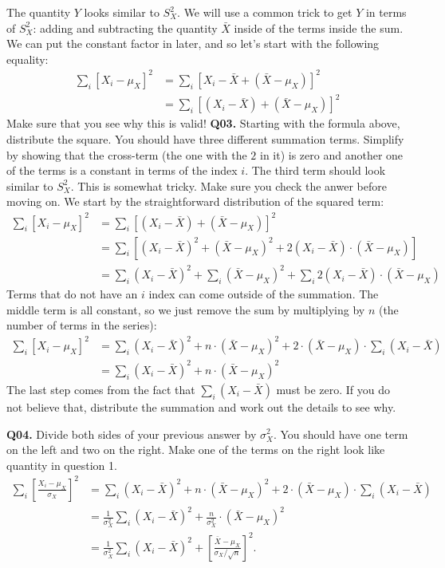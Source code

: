 \documentclass[12pt]{article}
\newcommand{\cblack}{\color{Black}}
\newcommand{\cblue}{\color{MidnightBlue}}
\begin{document}
The quantity $Y$ looks similar to $S_X^2$. We will use a common trick to
get $Y$ in terms of $S_X^2$: adding and subtracting the quantity $\bar{X}$
inside of the terms inside the sum. We can put the constant factor in later,
and so let's start with the following equality:
\begin{align*}
\sum_i \left[ X_i - \mu_X \right]^2 &= \sum_i \left[ X_i - \bar{X} + (\bar{X} - \mu_X) \right]^2  \\
&= \sum_i \left[ (X_i - \bar{X}) + (\bar{X} - \mu_X) \right]^2 
\end{align*}
Make sure that you see why this is valid! \textbf{Q03.} Starting with the
formula above, distribute the square. You should have three different summation
terms. Simplify by showing that the cross-term (the one with the $2$ in it) is
zero and another one of the terms is a constant in terms of the index $i$. The
third term should look similar to $S_X^2$. This is somewhat tricky. Make sure
you check the anwer before moving on. \cblue We start by the straightforward
distribution of the squared term:
\begin{align*}
\sum_i \left[ X_i - \mu_X \right]^2 &= \sum_i \left[ (X_i - \bar{X}) + (\bar{X} - \mu_X) \right]^2 \\
&= \sum_i \left[ (X_i - \bar{X})^2 + (\bar{X} - \mu_X)^2 + 2 (X_i - \bar{X}) \cdot (\bar{X} - \mu_X) \right] \\
&= \sum_i (X_i - \bar{X})^2 + \sum_i (\bar{X} - \mu_X)^2 + \sum_i 2 (X_i - \bar{X}) \cdot (\bar{X} - \mu_X)
\end{align*}
Terms that do not have an $i$ index can come outside of the summation. The middle
term is all constant, so we just remove the sum by multiplying by $n$ (the number
of terms in the series):
\begin{align*}
\sum_i \left[ X_i - \mu_X \right]^2 
&= \sum_i (X_i - \bar{X})^2 + n \cdot (\bar{X} - \mu_X)^2 + 2 \cdot (\bar{X} - \mu_X) \cdot \sum_i  (X_i - \bar{X}) \\
&= \sum_i (X_i - \bar{X})^2 + n \cdot (\bar{X} - \mu_X)^2
\end{align*}
The last step comes from the fact that $\sum_i (X_i - \bar{X})$ must be zero. If
you do not believe that, distribute the summation and work out the details to see
why. 
\cblack

\textbf{Q04.} Divide both sides of your previous answer by $\sigma_X^2$. You
should have one term on the left and two on the right. Make one of the terms
on the right look like quantity in question 1. \cblue
\begin{align*}
\sum_i \left[ \frac{X_i - \mu_X}{\sigma_X} \right]^2 
&= \sum_i (X_i - \bar{X})^2 + n \cdot (\bar{X} - \mu_X)^2 + 2 \cdot (\bar{X} - \mu_X) \cdot \sum_i  (X_i - \bar{X}) \\
&= \frac{1}{\sigma_X^2} \sum_i (X_i - \bar{X})^2 + \frac{n}{\sigma_X^2} \cdot (\bar{X} - \mu_X)^2 \\
&= \frac{1}{\sigma_X^2} \sum_i (X_i - \bar{X})^2 + \left[\frac{\bar{X} - \mu_X}{\sigma_X / \sqrt{n}} \right]^2.
\end{align*}
\cblack
\end{document}
